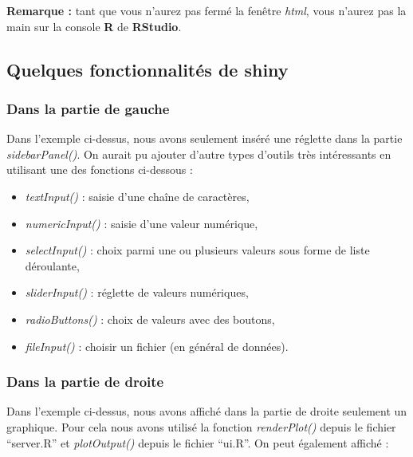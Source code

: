 \documentclass[
]{book}
\providecommand{\tightlist}{%
  \setlength{\itemsep}{0pt}\setlength{\parskip}{0pt}}
\theoremstyle{definition}
\theoremstyle{definition}
\theoremstyle{definition}
\theoremstyle{definition}
\theoremstyle{remark}
\begin{document}
\textbf{Remarque :} tant que vous n'aurez pas fermé la fenêtre \emph{html}, vous n'aurez pas la main sur la console \textbf{R} de \textbf{RStudio}.

\hypertarget{quelques-fonctionnalituxe9s-de-shiny}{%
\subsection{\texorpdfstring{Quelques fonctionnalités de \textbf{shiny}}{Quelques fonctionnalités de shiny}}\label{quelques-fonctionnalituxe9s-de-shiny}}

\hypertarget{dans-la-partie-de-gauche}{%
\subsubsection{Dans la partie de gauche}\label{dans-la-partie-de-gauche}}

Dans l'exemple ci-dessus, nous avons seulement inséré une réglette dans la partie \emph{sidebarPanel()}. On aurait pu ajouter d'autre types d'outils très intéressants en utilisant une des fonctions ci-dessous :

\begin{itemize}
\tightlist
\item
  \emph{textInput()} : saisie d'une chaîne de caractères,
\item
  \emph{numericInput()} : saisie d'une valeur numérique,
\item
  \emph{selectInput()} : choix parmi une ou plusieurs valeurs sous forme de liste déroulante,
\item
  \emph{sliderInput()} : réglette de valeurs numériques,
\item
  \emph{radioButtons()} : choix de valeurs avec des boutons,
\item
  \emph{fileInput()} : choisir un fichier (en général de données).
\end{itemize}

\hypertarget{dans-la-partie-de-droite}{%
\subsubsection{Dans la partie de droite}\label{dans-la-partie-de-droite}}

Dans l'exemple ci-dessus, nous avons affiché dans la partie de droite seulement un graphique. Pour cela nous avons utilisé la fonction \emph{renderPlot()} depuis le fichier ``server.R'' et \emph{plotOutput()} depuis le fichier ``ui.R''. On peut également affiché :
\end{document}

